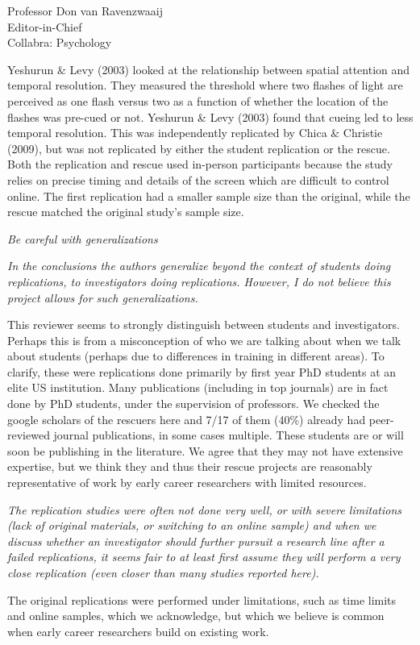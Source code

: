 \documentclass{stanfordletter}
\newcommand{\theysaid}[1]{\begin{leftbar} \noindent 
		\textsl{ #1}\end{leftbar}}
\begin{document}
\begin{letter}{Professor Don van Ravenzwaaij \\ Editor-in-Chief \\ Collabra: Psychology }
{		 	Yeshurun \& Levy (2003) looked at the relationship between spatial attention and temporal resolution.
		 	They measured the threshold where two flashes of light are perceived as one flash versus two as a function of whether the location of the flashes was pre-cued or not.
		 	Yeshurun \& Levy (2003) found that cueing led to less temporal resolution.
		 	This was independently replicated by Chica \& Christie (2009), but was not replicated by either the student replication or the rescue.
		 	Both the replication and rescue used in-person participants because the study relies on precise timing and details of the screen which are difficult to control online.
		 	The first replication had a smaller sample size than the original, while the rescue matched the original study's sample size.
		 	
		 	
		 }
		
		\theysaid{Be careful with generalizations}
		\theysaid{In the conclusions the authors generalize beyond the context of students doing replications, to investigators doing replications. However, I do not believe this project allows for such generalizations.} 
		
		This reviewer seems to strongly distinguish between students and investigators. Perhaps this is from a misconception of who we are talking about when we talk about students (perhaps due to differences in training in different areas). To clarify, these were replications done primarily by first year PhD students at an elite US institution. Many publications (including in top journals) are in fact done by PhD students, under the supervision of professors. We checked the google scholars of the rescuers here and 7/17 of them (40\%) already had peer-reviewed journal publications, in some cases multiple. These students are or will soon be publishing in the literature. We agree that they may not have extensive expertise, but we think they and thus their rescue projects are reasonably representative of work by early career researchers with limited resources. 
		
		\theysaid{The replication studies were often not done very well, or with severe limitations (lack of original materials, or switching to an online sample) and when we discuss whether an investigator should further pursuit a research line after a failed replications, it seems fair to at least first assume they will perform a very close replication (even closer than many studies reported here).}
		
		The original replications were performed under limitations, such as time limits and online samples, which we acknowledge, but which we believe is common when early career researchers build on existing work. 
		

\end{letter}
\end{document}
